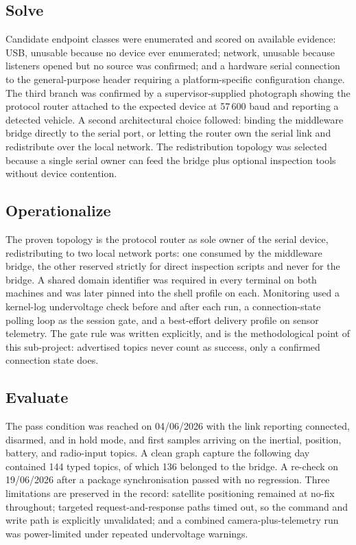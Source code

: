 \documentclass[a4paper,12pt,oneside,openany]{report}
\begin{document}
\subsection{Solve}

Candidate endpoint classes were enumerated and scored on available evidence: USB, unusable because
no device ever enumerated; network, unusable because listeners opened but no source was confirmed;
and a hardware serial connection to the general-purpose header requiring a platform-specific
configuration change. The third branch was confirmed by a supervisor-supplied photograph showing the
protocol router attached to the expected device at 57\,600 baud and reporting a detected vehicle. A
second architectural choice followed: binding the middleware bridge directly to the serial port, or
letting the router own the serial link and redistribute over the local network. The redistribution
topology was selected because a single serial owner can feed the bridge plus optional inspection
tools without device contention.

\subsection{Operationalize}

The proven topology is the protocol router as sole owner of the serial device, redistributing to two
local network ports: one consumed by the middleware bridge, the other reserved strictly for direct
inspection scripts and never for the bridge. A shared domain identifier was required in every
terminal on both machines and was later pinned into the shell profile on each. Monitoring used a
kernel-log undervoltage check before and after each run, a connection-state polling loop as the
session gate, and a best-effort delivery profile on sensor telemetry. The gate rule was written
explicitly, and is the methodological point of this sub-project: advertised topics never count as
success, only a confirmed connection state does.

\subsection{Evaluate}

The pass condition was reached on 04/06/2026 with the link reporting connected, disarmed, and in
hold mode, and first samples arriving on the inertial, position, battery, and radio-input topics. A
clean graph capture the following day contained 144 typed topics, of which 136 belonged to the
bridge. A re-check on 19/06/2026 after a package synchronisation passed with no regression. Three
limitations are preserved in the record: satellite positioning remained at no-fix throughout;
targeted request-and-response paths timed out, so the command and write path is explicitly
unvalidated; and a combined camera-plus-telemetry run was power-limited under repeated undervoltage
warnings.
\end{document}
